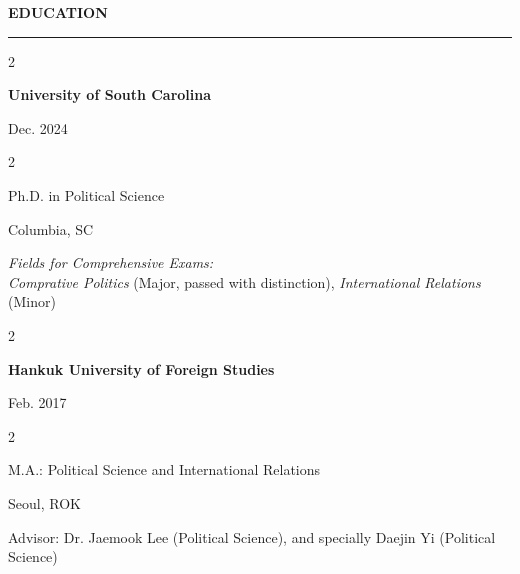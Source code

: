 \documentclass[
  16,
]{article}
\begin{document}
\vspace{3pt}
\begin{large}
 {\bf EDUCATION}
  \vspace{3pt}
  \hrule
  \begin{multicols}{2}
    \begin{flushleft}{\bf University of South Carolina}\end{flushleft}
    \begin{flushright}Dec. 2024\end{flushright}
  \end{multicols}
  \vspace{-0.17cm}
  \begin{multicols}{2}
    \begin{flushleft}Ph.D. in Political Science\end{flushleft}
    \begin{flushright}Columbia, SC\end{flushright}
  \end{multicols}
  \vspace{-0.25cm}
  \hspace{3pt}\textit{Fields for Comprehensive Exams:}\\
  \vspace{-0.25cm}
  \hspace{6pt}\textit{Comprative Politics} (Major, passed with distinction), \textit{International Relations} (Minor)
\end{large}
\vspace{3pt}

\vspace{7pt}
\begin{large}
   \begin{multicols}{2}
    \begin{flushleft}{\bf Hankuk University of Foreign Studies}\end{flushleft}
    \begin{flushright}Feb. 2017\end{flushright}
  \end{multicols}
  \vspace{-0.17cm}
  \begin{multicols}{2}
    \begin{flushleft}M.A.: Political Science and International Relations\end{flushleft}
    \begin{flushright}Seoul, ROK\end{flushright}
  \end{multicols}
  \vspace{-0.25cm}
  \hspace{3pt}Advisor: Dr. Jaemook Lee (Political Science), and specially Daejin Yi (Political Science)
\end{large}
\vspace{3pt}
\end{document}
